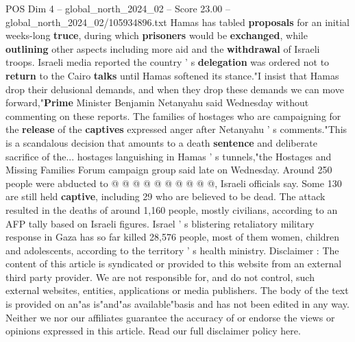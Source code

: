 \begin{textsample}{POS Dim 4 – global\_north\_2024\_02 – Score 23.00 – global\_north\_2024\_02/105934896.txt}
Hamas has tabled \textbf{proposals} for an initial weeks-long \textbf{truce}, during which \textbf{prisoners} would be \textbf{exchanged}, while \textbf{outlining} other aspects including more aid and the \textbf{withdrawal} of Israeli troops.
Israeli media reported the country ' s \textbf{delegation} was ordered not to \textbf{return} to the Cairo \textbf{talks} until Hamas softened its stance."I insist that Hamas drop their delusional demands, and when they drop these demands we can move forward,"\textbf{Prime} Minister Benjamin Netanyahu said Wednesday without commenting on these reports.
The families of hostages who are campaigning for the \textbf{release} of the \textbf{captives} expressed anger after Netanyahu ' s comments."This is a scandalous decision that amounts to a death \textbf{sentence} and deliberate sacrifice of the... hostages languishing in Hamas ' s tunnels,"the Hostages and Missing Families Forum campaign group said late on Wednesday.
Around 250 people were abducted to @ @ @ @ @ @ @ @ @ @, Israeli officials say.
Some 130 are still held \textbf{captive}, including 29 who are believed to be dead.
The attack resulted in the deaths of around 1,160 people, mostly civilians, according to an AFP tally based on Israeli figures.
Israel ' s blistering retaliatory military response in Gaza has so far killed 28,576 people, most of them women, children and adolescents, according to the territory ' s health ministry.
Disclaimer : The content of this article is syndicated or provided to this website from an external third party provider.
We are not responsible for, and do not control, such external websites, entities, applications or media publishers.
The body of the text is provided on an"as is"and"as available"basis and has not been edited in any way.
Neither we nor our affiliates guarantee the accuracy of or endorse the views or opinions expressed in this article.
Read our full disclaimer policy here.

\end{textsample}
